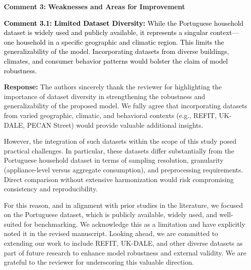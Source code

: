 \documentclass[12pt]{article}
\begin{document}
\noindent\textbf{Comment 3:} \textbf{Weaknesses and Areas for Improvement}
\newline



\noindent\textcolor{black}{\noindent\textbf{Comment 3.1:} \textbf{Limited Dataset Diversity:} While the Portuguese household dataset is widely used and publicly available, it represents a singular context—one household in a specific geographic and climatic region. This limits the generalizability of the model. Incorporating datasets from diverse buildings, climates, and consumer behavior patterns would bolster the claim of model robustness.}
\vspace{0.15cm}

\hspace{-1.5em}\textbf{Response:}
The authors sincerely thank the reviewer for highlighting the importance of dataset diversity in strengthening the robustness and generalizability of the proposed model. We fully agree that incorporating datasets from varied geographic, climatic, and behavioral contexts (e.g., REFIT, UK-DALE, PECAN Street) would provide valuable additional insights.

However, the integration of such datasets within the scope of this study posed practical challenges. In particular, these datasets differ substantially from the Portuguese household dataset in terms of sampling resolution, granularity (appliance-level versus aggregate consumption), and preprocessing requirements. Direct comparison without extensive harmonization would risk compromising consistency and reproducibility. 

For this reason, and in alignment with prior studies in the literature, we focused on the Portuguese dataset, which is publicly available, widely used, and well-suited for benchmarking.
We acknowledge this as a limitation and have explicitly noted it in the revised manuscript. Looking ahead, we are committed to extending our work to include REFIT, UK-DALE, and other diverse datasets as part of future research to enhance model robustness and external validity. We are grateful to the reviewer for underscoring this valuable direction.\newline
\newline




\vspace{0.15cm}
\end{document}
